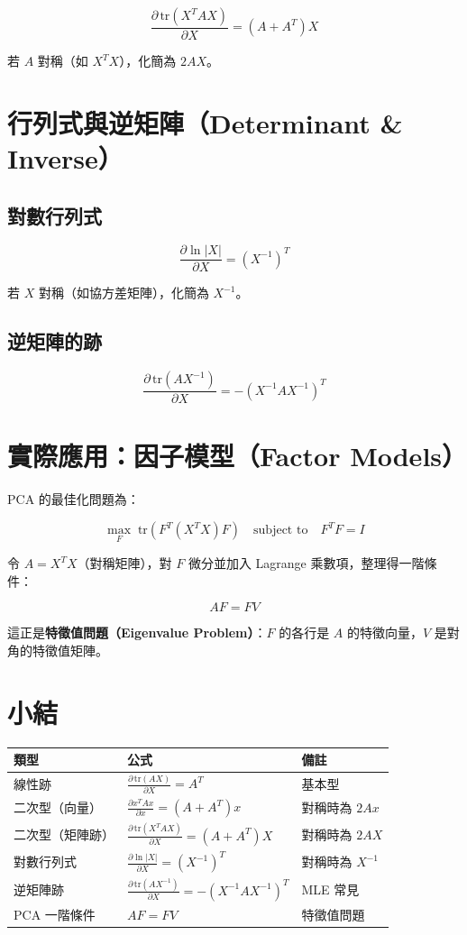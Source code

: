 \documentclass[12pt, a4paper]{article}
\begin{document}
$$\frac{\partial \, \text{tr}(X^T A X)}{\partial X} = (A + A^T)X$$

若 $A$ 對稱（如 $X^T X$），化簡為 $2AX$。

\section{行列式與逆矩陣（Determinant \& Inverse）}

\subsection*{對數行列式}

$$\frac{\partial \ln |X|}{\partial X} = (X^{-1})^T$$

若 $X$ 對稱（如協方差矩陣），化簡為 $X^{-1}$。

\subsection*{逆矩陣的跡}

$$\frac{\partial \, \text{tr}(A X^{-1})}{\partial X} = -(X^{-1} A X^{-1})^T$$

\section{實際應用：因子模型（Factor Models）}

PCA 的最佳化問題為：

$$\max_{F} \; \text{tr}\!\left(F^T (X^T X) F\right) \quad \text{subject to} \quad F^T F = I$$

令 $A = X^T X$（對稱矩陣），對 $F$ 微分並加入 Lagrange 乘數項，整理得一階條件：

$$AF = FV$$

這正是\textbf{特徵值問題（Eigenvalue Problem）}：$F$ 的各行是 $A$ 的特徵向量，$V$ 是對角的特徵值矩陣。

\section{小結}

\begin{table}[h]
\centering
\begin{tabular}{lll}
\toprule
類型 & 公式 & 備註 \\
\midrule
線性跡 & $\frac{\partial \, \text{tr}(AX)}{\partial X} = A^T$ & 基本型 \\
二次型（向量） & $\frac{\partial x^T A x}{\partial x} = (A+A^T)x$ & 對稱時為 $2Ax$ \\
二次型（矩陣跡） & $\frac{\partial \, \text{tr}(X^T AX)}{\partial X} = (A+A^T)X$ & 對稱時為 $2AX$ \\
對數行列式 & $\frac{\partial \ln |X|}{\partial X} = (X^{-1})^T$ & 對稱時為 $X^{-1}$ \\
逆矩陣跡 & $\frac{\partial \, \text{tr}(AX^{-1})}{\partial X} = -(X^{-1}AX^{-1})^T$ & MLE 常見 \\
PCA 一階條件 & $AF = FV$ & 特徵值問題 \\
\bottomrule
\end{tabular}
\end{table}
\end{document}
